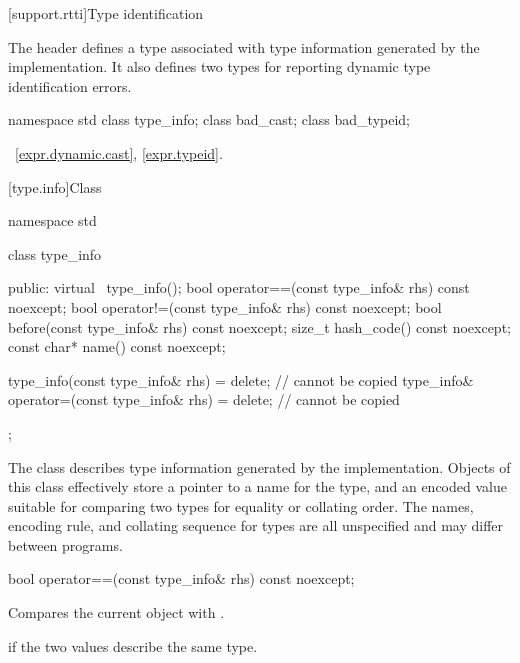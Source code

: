 [support.rtti]{Type identification}

\pnum
The header
defines a
type associated with type information generated by the implementation.
It also defines two types for reporting dynamic type identification errors.

%
%

%
%
%
\begin{codeblock}
namespace std {
  class type_info;
  class bad_cast;
  class bad_typeid;
}
\end{codeblock}

\xref~\ref{expr.dynamic.cast}, \ref{expr.typeid}.

[type.info]{Class }

%
\begin{codeblock}
namespace std {
  class type_info {
  public:
    virtual ~type_info();
    bool operator==(const type_info& rhs) const noexcept;
    bool operator!=(const type_info& rhs) const noexcept;
    bool before(const type_info& rhs) const noexcept;
    size_t hash_code() const noexcept;
    const char* name() const noexcept;

    type_info(const type_info& rhs) = delete;            // cannot be copied
    type_info& operator=(const type_info& rhs) = delete; // cannot be copied
  };
}
\end{codeblock}

\pnum
The class
describes type information generated by the implementation.
Objects of this class effectively store a pointer to a name for the type, and
an encoded value suitable for comparing two types for equality or collating order.
The names, encoding rule, and collating sequence for types are all unspecified
%
and may differ between programs.

%
\begin{itemdecl}
bool operator==(const type_info& rhs) const noexcept;
\end{itemdecl}

\begin{itemdescr}
\pnum
\effects
Compares the current object with .

\pnum
\returns
{}
if the two values describe the same type.
\end{itemdescr}

